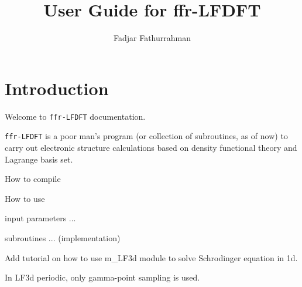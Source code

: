 \documentclass[a4paper,11pt,fleqn]{extarticle}
\begin{document}
\title{User Guide for {\ttfamily ffr-LFDFT}}
\author{Fadjar Fathurrahman}
\date{}
\maketitle

\tableofcontents

\section{Introduction}

Welcome to {\tt ffr-LFDFT} documentation.

{\tt ffr-LFDFT} is a poor man's program (or collection of subroutines, as of now)
to carry out electronic structure calculations based on density functional theory
and Lagrange basis set.

How to compile

How to use

input parameters ...

subroutines ... (implementation)

Add tutorial on how to use m\_LF3d module to solve Schrodinger equation
in 1d.

In LF3d periodic, only gamma-point sampling is used.






\end{document}
